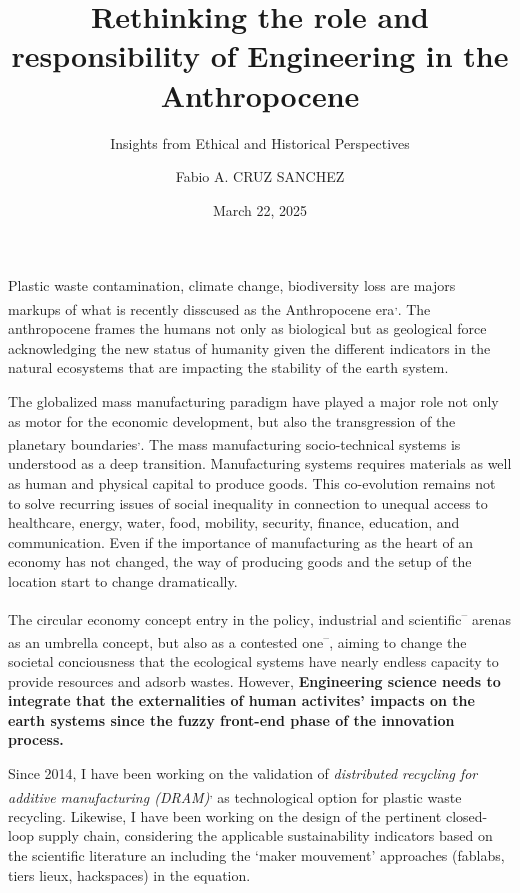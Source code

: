 \documentclass[
  11pt,
  a4paperpaper,
  onecolumn]{article}
\title{Rethinking the role and responsibility of Engineering in the
Anthropocene}
\subtitle{Insights from Ethical and Historical Perspectives}
\author{Fabio A. CRUZ SANCHEZ}
\date{March 22, 2025}
\begin{document}
\maketitle


\thispagestyle{fancy}

Plastic waste
contamination\textsuperscript{},
climate change\textsuperscript{},
biodiversity loss\textsuperscript{} are
majors markups of what is recently disscused as the Anthropocene
era\textsuperscript{,}.
The anthropocene frames the humans not only as biological but as
geological force acknowledging the new status of humanity given the
different indicators in the natural ecosystems that are impacting the
stability of the earth system.

The globalized mass manufacturing paradigm have played a major role not
only as motor for the economic development, but also the transgression
of the planetary
boundaries\textsuperscript{,}.
The mass manufacturing socio-technical systems is understood as a deep
transition. Manufacturing systems requires materials as well as human
and physical capital to produce goods. This co-evolution remains not to
solve recurring issues of social inequality in connection to unequal
access to healthcare, energy, water, food, mobility, security, finance,
education, and communication. Even if the importance of manufacturing as
the heart of an economy has not changed, the way of producing goods and
the setup of the location start to change dramatically.

The circular economy concept entry in the
policy\textsuperscript{},
industrial\textsuperscript{}
and
scientific\textsuperscript{--}
arenas as an umbrella concept, but also as a contested
one\textsuperscript{--},
aiming to change the societal conciousness that the ecological systems
have nearly endless capacity to provide resources and adsorb wastes.
However, \textbf{Engineering science needs to integrate that the
externalities\textsuperscript{} of human
activites' impacts on the earth systems since the fuzzy front-end phase
of the innovation process.}

Since 2014, I have been working on the validation of \emph{distributed
recycling for additive manufacturing
(DRAM)}\textsuperscript{,}
as technological option for plastic waste recycling. Likewise, I have
been working on the design of the pertinent closed-loop supply
chain\textsuperscript{}, considering the
applicable sustainability indicators based on the scientific literature
an including the `maker mouvement' approaches (fablabs, tiers lieux,
hackspaces) in the equation.
\end{document}
